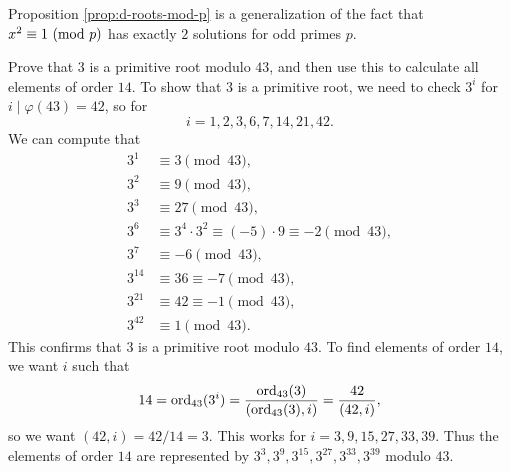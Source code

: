 \begin{remark}
  Proposition \ref{prop:d-roots-mod-p}
  is a generalization of the fact that
  $x^2 \equiv 1 \ (\mathrm{mod}\ p)$ has exactly
  $2$ solutions for odd primes $p$.
\end{remark}

\begin{example}
  Prove that $3$ is a primitive root
  modulo $43$, and then use this to
  calculate all elements of order $14$.
  To show that $3$ is a primitive root,
  we need to check $3^i$ for
  $i \mid \varphi(43) = 42$, so for
  \[
    i = 1, 2, 3, 6, 7, 14, 21, 42.
  \]
  We can compute that
  \begin{align*}
    3^1 &\equiv 3 \pmod{43},\\
    3^2 &\equiv 9 \pmod{43},\\
    3^3 &\equiv 27 \pmod{43},\\
    3^6 &\equiv 3^4 \cdot 3^2 \equiv (-5) \cdot 9 \equiv -2 \pmod{43},\\
    3^7 &\equiv -6 \pmod{43},\\
    3^{14} &\equiv 36 \equiv -7 \pmod{43},\\
    3^{21} &\equiv 42 \equiv -1 \pmod{43},\\
    3^{42} &\equiv 1 \pmod{43}.
  \end{align*}
  This confirms that $3$ is a primitive root modulo
  $43$. To find elements of order $14$, we
  want $i$ such that
  \[
    14 = \operatorname{ord}_{43}(3^i)
    = \frac{\operatorname{ord}_{43}(3)}{(\operatorname{ord}_{43}(3), i)}
    = \frac{42}{(42, i)},
  \]
  so we want $(42, i) = 42 / 14 = 3$.
  This works for
  $i = 3, 9, 15, 27, 33, 39$. Thus the
  elements of order $14$ are represented
  by $3^3, 3^9, 3^{15}, 3^{27}, 3^{33}, 3^{39}$ modulo $43$.
\end{example}
